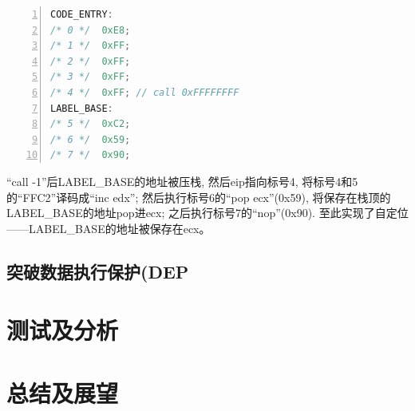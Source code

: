 \documentclass[bachelor]{thesis-uestc}
\begin{document}
\begin{lstlisting}[language=C++, basicstyle=\ttfamily\tiny, numbers=left, numberstyle=\tiny, keywordstyle=\color{blue!70}, commentstyle=\color{red!50!green!50!blue!50}, frame=shadowbox, rulesepcolor=\color{red!20!green!20!blue!20}]
CODE_ENTRY:
/* 0 */	 0xE8;
/* 1 */	 0xFF;
/* 2 */	 0xFF;
/* 3 */	 0xFF;
/* 4 */	 0xFF; // call 0xFFFFFFFF
LABEL_BASE:
/* 5 */	 0xC2;
/* 6 */	 0x59;
/* 7 */	 0x90;
\end{lstlisting}

``call -1''后LABEL\_BASE的地址被压栈, 然后eip指向标号4, 将标号4和5的``FFC2''译码成``inc edx''; 然后执行标号6的``pop ecx''(0x59), 将保存在栈顶的LABEL\_BASE的地址pop进ecx; 之后执行标号7的``nop''(0x90). 至此实现了自定位——LABEL\_BASE的地址被保存在ecx。

\section{突破数据执行保护(DEP}

\chapter{测试及分析}

\chapter{总结及展望}
\end{document}
